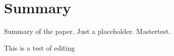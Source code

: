 \chapter{Summary}

Summary of the paper. Just a placeholder. Mastertest.

This is a test of editing
